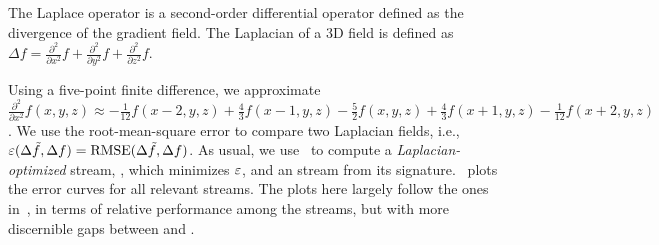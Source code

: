 The Laplace operator is a second-order differential operator defined as the divergence of the
gradient field. The Laplacian of a 3D field is defined as $\Delta
f=\frac{{\partial}^2}{\partial{x^2}}f+\frac{{\partial}^2}{\partial{y^2}}f+\frac{{\partial}^2}{\partial{z^2}}f$.

Using a five-point finite difference, we approximate $\frac{{\partial}^2}{\partial{x^2}}f(x,y,z)
\approx
-\frac{1}{12}f(x-2,y,z)+\frac{4}{3}f(x-1,y,z)-\frac{5}{2}f(x,y,z)+\frac{4}{3}f(x+1,y,z)-\frac{1}{12}f(x+2,y,z)$.
We use the root-mean-square error to compare two Laplacian fields, i.e., $\err(\Delta
\tilde{f},\Delta f)=\text{RMSE}(\Delta \tilde{f},\Delta f)$. As usual, we use~ to
compute a \emph{Laplacian-optimized} stream, \slop, which minimizes $\err$, and an \slsg stream from
its signature.~ plots the error curves for all relevant
streams. The plots here largely follow the ones in~, in terms of
relative performance among the streams, but with more discernible gaps between \sbit and \slsg.
